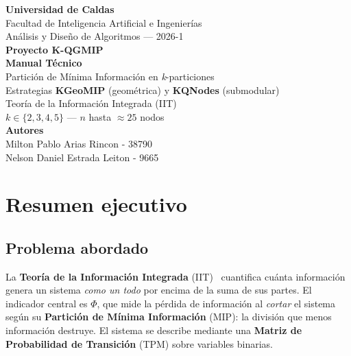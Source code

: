 \documentclass[11pt,letterpaper]{article}
\begin{document}
\begin{titlepage}
	\centering
	\vspace*{1.5cm}
	{\large\textbf{Universidad de Caldas}}\\[0.2cm]
	{\normalsize Facultad de Inteligencia Artificial e Ingenierías}\\[0.2cm]
	{\normalsize Análisis y Diseño de Algoritmos — 2026-1}\\[2.5cm]
	{\Huge\textbf{Proyecto K-QGMIP}}\\[0.6cm]
	{\LARGE\textbf{Manual Técnico}}\\[0.4cm]
	{\large Partición de Mínima Información en \emph{k}-particiones}\\[0.3cm]
	{\large Estrategias \textbf{KGeoMIP} (geométrica) y \textbf{KQNodes} (submodular)}\\[3cm]
	{\normalsize Teoría de la Información Integrada (IIT)}\\[0.2cm]
	{\normalsize $k \in \{2,3,4,5\}$ \quad — \quad $n$ hasta $\approx 25$ nodos}\\[2cm]
	{\large\textbf{Autores}}\\[0.2cm]
	{\normalsize Milton Pablo Arias Rincon - 38790}\\[0.1cm]
	{\normalsize Nelson Daniel Estrada Leiton - 9665}\\[1.5cm]
	{\small \mesano}
	\vfill
\end{titlepage}

\tableofcontents
\newpage

\section{Resumen ejecutivo}

\subsection{Problema abordado}
La \textbf{Teoría de la Información Integrada} (IIT)~\cite{tononi,oizumi} cuantifica
cuánta información genera un sistema \emph{como un todo} por encima de la suma de sus
partes. El
indicador central es $\Phi$, que mide la pérdida de información al \emph{cortar}
el sistema según su \textbf{Partición de Mínima Información} (MIP): la división
que menos información destruye. El sistema se describe mediante una
\textbf{Matriz de Probabilidad de Transición} (TPM) sobre variables binarias.
\end{document}
